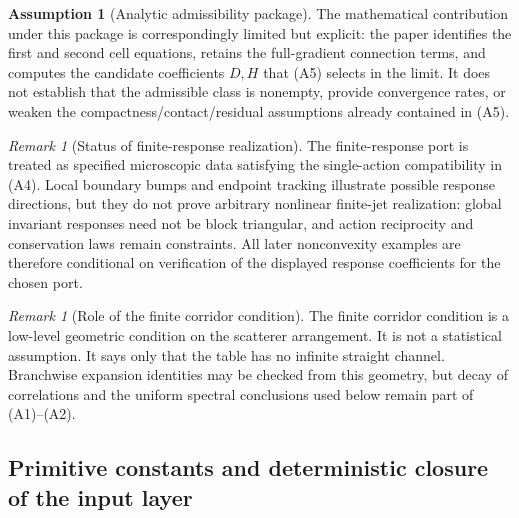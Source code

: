 \documentclass[12pt, letterpaper]{amsart}
\theoremstyle{plain}
\theoremstyle{definition}
\newtheorem{assumption}[theorem]{Assumption}
\theoremstyle{remark}
\newtheorem{remark}[theorem]{Remark}
\begin{document}
\begin{assumption}[Analytic admissibility package]
The mathematical contribution under this package is correspondingly limited
but explicit: the paper identifies the first and second cell equations, retains
the full-gradient connection terms, and computes the candidate coefficients
$D,H$ that \textup{(A5)} selects in the limit.  It does not establish that the
admissible class is nonempty, provide convergence rates, or weaken the
compactness/contact/residual assumptions already contained in \textup{(A5)}.
\end{assumption}

\begin{remark}[Status of finite-response realization]
\label{rem:finite_jet_status}
The finite-response port is treated as specified microscopic data satisfying
the single-action compatibility in \textup{(A4)}.  Local boundary bumps and
endpoint tracking illustrate possible response directions, but they do not
prove arbitrary nonlinear finite-jet realization: global invariant responses
need not be block triangular, and action reciprocity and conservation laws
remain constraints.  All later nonconvexity examples are therefore conditional
on verification of the displayed response coefficients for the chosen port.
\end{remark}

\begin{remark}[Role of the finite corridor condition]
The finite corridor condition is a low-level geometric condition on the scatterer arrangement.  It is not a statistical assumption.  It says only that the table has no infinite straight channel.  Branchwise expansion identities may be checked from this geometry, but decay of correlations and the uniform spectral conclusions used below remain part of \textup{(A1)--(A2)}.
\end{remark}

\subsection{Primitive constants and deterministic closure of the input layer}
\label{subsec:primitive_constant_closure}
\end{document}
